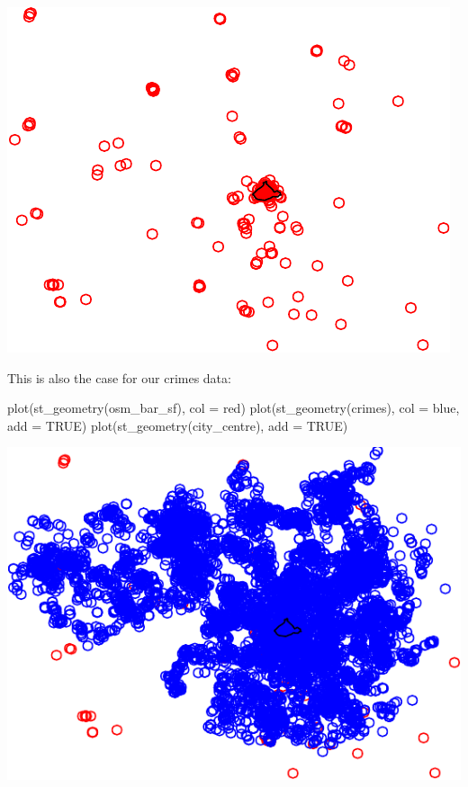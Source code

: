 \documentclass[
  krantz2]{krantz}
\makeatletter
\newenvironment{Shaded}{\begin{snugshade}}{\end{snugshade}}
\newcommand{\AttributeTok}[1]{\textcolor[rgb]{0.61,0.61,0.61}{#1}}
\newcommand{\ConstantTok}[1]{\textcolor[rgb]{0,0,0}{#1}}
\newcommand{\FunctionTok}[1]{\textcolor[rgb]{0,0,0}{#1}}
\newcommand{\NormalTok}[1]{#1}
\newcommand{\StringTok}[1]{\textcolor[rgb]{0.5,0.5,0.5}{#1}}
\newenvironment{kframe}{%
\medskip{}
\setlength{\fboxsep}{.8em}
 \def\at@end@of@kframe{}%
 \ifinner\ifhmode%
  \def\at@end@of@kframe{\end{minipage}}%
  \begin{minipage}{\columnwidth}%
 \fi\fi%
 \def\FrameCommand##1{\hskip\@totalleftmargin \hskip-\fboxsep
 \colorbox{shadecolor}{##1}\hskip-\fboxsep
     \hskip-\linewidth \hskip-\@totalleftmargin \hskip\columnwidth}%
 \MakeFramed {\advance\hsize-\width
   \@totalleftmargin\z@ \linewidth\hsize
   \@setminipage}}%
 {\par\unskip\endMakeFramed%
 \at@end@of@kframe}
\renewenvironment{Shaded}{\begin{kframe}}{\end{kframe}}
\makeatother
\begin{document}
\includegraphics{crime_mapping_files/figure-latex/plot_bars-1.pdf}

This is also the case for our crimes data:

\begin{Shaded}
\begin{Highlighting}[]
\FunctionTok{plot}\NormalTok{(}\FunctionTok{st\_geometry}\NormalTok{(osm\_bar\_sf), }\AttributeTok{col =} \StringTok{\textquotesingle{}red\textquotesingle{}}\NormalTok{)}
\FunctionTok{plot}\NormalTok{(}\FunctionTok{st\_geometry}\NormalTok{(crimes), }\AttributeTok{col =} \StringTok{\textquotesingle{}blue\textquotesingle{}}\NormalTok{, }\AttributeTok{add =} \ConstantTok{TRUE}\NormalTok{)}
\FunctionTok{plot}\NormalTok{(}\FunctionTok{st\_geometry}\NormalTok{(city\_centre), }\AttributeTok{add =} \ConstantTok{TRUE}\NormalTok{)}
\end{Highlighting}
\end{Shaded}

\includegraphics{crime_mapping_files/figure-latex/plot_crimes-1.pdf}
\end{document}
